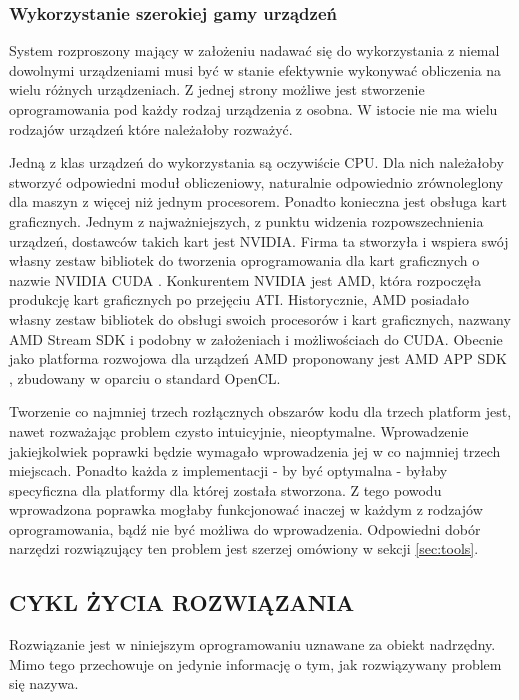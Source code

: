 \documentclass[12pt,a4paper,twoside]{article}
\begin{document}
\subsubsection{Wykorzystanie szerokiej gamy urządzeń}

System rozproszony mający w założeniu nadawać się do wykorzystania z niemal dowolnymi urządzeniami musi być w stanie efektywnie wykonywać obliczenia na wielu różnych urządzeniach. Z jednej strony możliwe jest stworzenie oprogramowania pod każdy rodzaj urządzenia z osobna. W istocie nie ma wielu rodzajów urządzeń które należałoby rozważyć. 

Jedną z klas urządzeń do wykorzystania są oczywiście CPU. Dla nich należałoby stworzyć odpowiedni moduł obliczeniowy, naturalnie odpowiednio zrównoleglony dla maszyn z więcej niż jednym procesorem. Ponadto konieczna jest obsługa kart graficznych. Jednym z najważniejszych, z punktu widzenia rozpowszechnienia urządzeń, dostawców takich kart jest NVIDIA. Firma ta stworzyła i wspiera swój własny zestaw bibliotek do tworzenia oprogramowania dla kart graficznych o nazwie NVIDIA CUDA \cite{cuda}. Konkurentem NVIDIA jest AMD, która rozpoczęła produkcję kart graficznych po przejęciu ATI. Historycznie, AMD posiadało własny zestaw bibliotek do obsługi swoich procesorów i kart graficznych, nazwany AMD Stream SDK i podobny w założeniach i możliwościach do CUDA. Obecnie jako platforma rozwojowa dla urządzeń AMD proponowany jest AMD APP SDK \cite{appsdk}, zbudowany w oparciu o standard OpenCL.

Tworzenie co najmniej trzech rozłącznych obszarów kodu dla trzech platform jest, nawet rozważając problem czysto intuicyjnie, nieoptymalne. Wprowadzenie jakiejkolwiek poprawki będzie wymagało wprowadzenia jej w co najmniej trzech miejscach. Ponadto każda z implementacji - by być optymalna - byłaby specyficzna dla platformy dla której została stworzona. Z tego powodu wprowadzona poprawka mogłaby funkcjonować inaczej w każdym z rodzajów oprogramowania, bądź nie być możliwa do wprowadzenia. Odpowiedni dobór narzędzi rozwiązujący ten problem jest szerzej omówiony w sekcji \ref{sec:tools}.

\subsection{CYKL ŻYCIA ROZWIĄZANIA}

Rozwiązanie jest w niniejszym oprogramowaniu uznawane za obiekt nadrzędny. Mimo tego przechowuje on jedynie informację o tym, jak rozwiązywany problem się nazywa.
\end{document}
